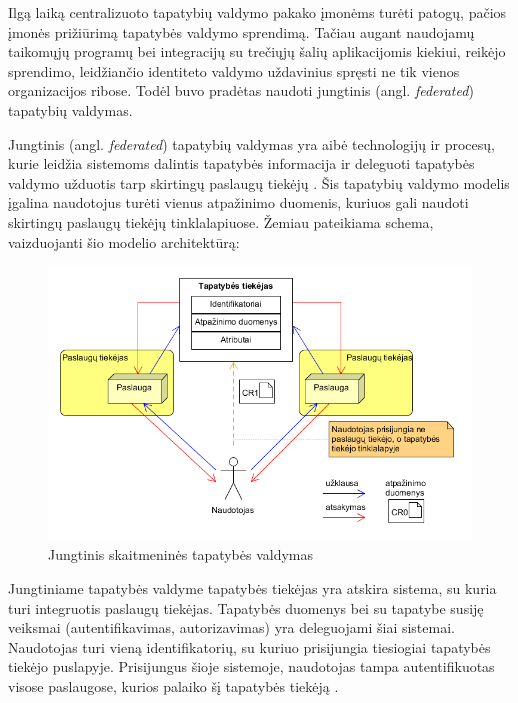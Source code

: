 
Ilgą laiką centralizuoto tapatybių valdymo pakako įmonėms turėti patogų, pačios įmonės prižiūrimą tapatybės valdymo sprendimą. Tačiau augant 
naudojamų taikomųjų programų bei integracijų su trečiųjų šalių aplikacijomis kiekiui, reikėjo sprendimo, leidžiančio identiteto valdymo uždavinius
spręsti ne tik vienos organizacijos ribose. Todėl buvo pradėtas naudoti jungtinis (angl. \textit{federated}) tapatybių valdymas.

Jungtinis (angl. \textit{federated}) tapatybių valdymas yra aibė technologijų
ir procesų, kurie leidžia sistemoms dalintis tapatybės informacija ir deleguoti tapatybės valdymo užduotis
tarp skirtingų paslaugų tiekėjų \cite{Maler2008}. Šis tapatybių valdymo modelis įgalina naudotojus turėti vienus atpažinimo duomenis,
kuriuos gali naudoti skirtingų paslaugų tiekėjų tinklalapiuose. Žemiau pateikiama schema, vaizduojanti
šio modelio architektūrą:

\begin{figure}[H]
    \centering
    \includegraphics[scale=0.7]{img/federatedModel}
    \caption{Jungtinis skaitmeninės tapatybės valdymas \cite{Cao2010}}
    \label{fig:federatedModel}
\end{figure}

Jungtiniame tapatybės valdyme tapatybės tiekėjas yra atskira sistema, su kuria turi integruotis paslaugų tiekėjas. Tapatybės
duomenys bei su tapatybe susiję veiksmai (autentifikavimas, autorizavimas) yra deleguojami šiai sistemai. Naudotojas turi vieną identifikatorių,
su kuriuo prisijungia tiesiogiai tapatybės tiekėjo puslapyje. Prisijungus šioje sistemoje, naudotojas tampa
autentifikuotas visose paslaugose, kurios palaiko šį tapatybės tiekėją \cite{Maler2008}.

